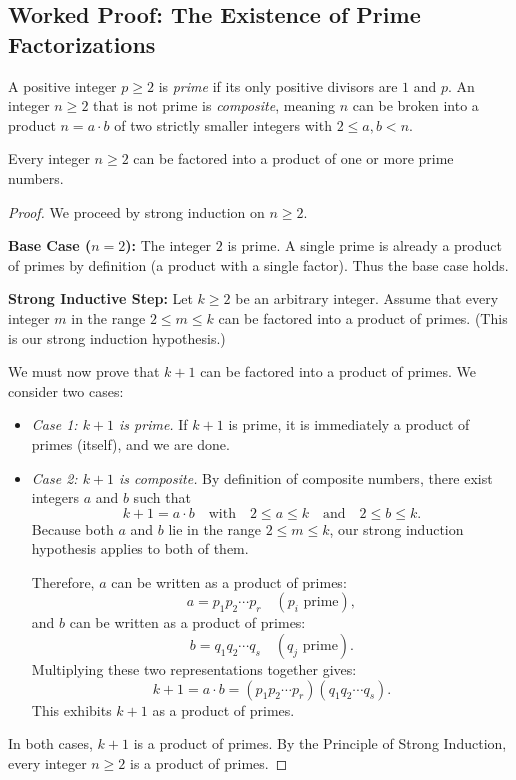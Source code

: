 \subsection{Worked Proof: The Existence of Prime Factorizations}

A positive integer $p \ge 2$ is \emph{prime} if its only positive divisors are $1$ and $p$. An integer $n \ge 2$ that is not prime is \emph{composite}, meaning $n$ can be broken into a product $n = a \cdot b$ of two strictly smaller integers with $2 \le a, b < n$.

\begin{theorem}
\label{18:thm-prime-factorization}
Every integer $n \ge 2$ can be factored into a product of one or more prime numbers.
\end{theorem}

\begin{proof}
We proceed by strong induction on $n \ge 2$.

\textbf{Base Case ($n = 2$):} The integer $2$ is prime. A single prime is already a product of primes by definition (a product with a single factor). Thus the base case holds.

\textbf{Strong Inductive Step:}
Let $k \ge 2$ be an arbitrary integer. 
Assume that every integer $m$ in the range $2 \le m \le k$ can be factored into a product of primes. (This is our strong induction hypothesis.)

We must now prove that $k+1$ can be factored into a product of primes. We consider two cases:

\begin{itemize}
\item \emph{Case 1: $k+1$ is prime.} If $k+1$ is prime, it is immediately a product of primes (itself), and we are done.
\item \emph{Case 2: $k+1$ is composite.} By definition of composite numbers, there exist integers $a$ and $b$ such that
\[
k + 1 = a \cdot b \quad \text{with} \quad 2 \le a \le k \quad \text{and} \quad 2 \le b \le k.
\]
Because both $a$ and $b$ lie in the range $2 \le m \le k$, our strong induction hypothesis applies to both of them.

Therefore, $a$ can be written as a product of primes:
\[
a = p_1 p_2 \cdots p_r \quad (p_i \text{ prime}),
\]
and $b$ can be written as a product of primes:
\[
b = q_1 q_2 \cdots q_s \quad (q_j \text{ prime}).
\]
Multiplying these two representations together gives:
\[
k + 1 = a \cdot b = (p_1 p_2 \cdots p_r)(q_1 q_2 \cdots q_s).
\]
This exhibits $k+1$ as a product of primes.
\end{itemize}

In both cases, $k+1$ is a product of primes. By the Principle of Strong Induction, every integer $n \ge 2$ is a product of primes.
\end{proof}

